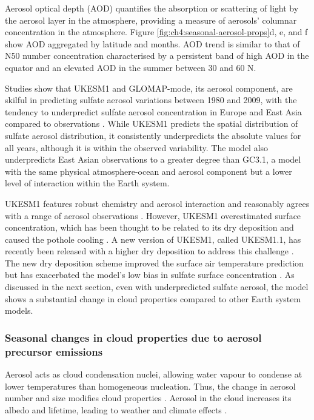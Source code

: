 Aerosol optical depth (AOD) quantifies the absorption or scattering of light by the aerosol layer in the atmosphere, providing a measure of aerosols' columnar concentration in the atmosphere. Figure \ref{fig:ch4:seasonal-aerosol-props}d, e, and f show AOD aggregated by latitude and months. AOD trend is similar to that of N50 number concentration characterised by a persistent band of high AOD in the equator and an elevated AOD in the summer between 30 and 60 \textdegree N. 

Studies show that UKESM1 and GLOMAP-mode, its aerosol component, are skilful in predicting sulfate aerosol variations between 1980 and 2009, with the tendency to underpredict sulfate aerosol concentration in Europe and East Asia compared to observations \citep{mannDescriptionEvaluationGLOMAPmode2010, mulcahyDescriptionEvaluationAerosol2020}. While UKESM1 predicts the spatial distribution of sulfate aerosol distribution, it consistently underpredicts the absolute values for all years, although it is within the observed variability. The model also underpredicts East Asian observations to a greater degree than GC3.1, a model with the same physical atmosphere-ocean and aerosol component but a lower level of interaction within the Earth system. 

UKESM1 features robust chemistry and aerosol interaction and reasonably agrees with a range of aerosol observations \citep{mulcahyDescriptionEvaluationAerosol2020}. However, UKESM1 overestimated surface  concentration, which has been thought to be related to its dry deposition and caused the pothole cooling \citep{hardacreEvaluationSO2SO422021}. A new version of UKESM1, called UKESM1.1, has recently been released with a higher  dry deposition to address this challenge \citep{mulcahyUKESM11DevelopmentEvaluation2023}. The new dry deposition scheme improved the surface air temperature prediction but has exacerbated the model's low bias in sulfate surface concentration \citep{hardacreEvaluationSO2SO422021}. As discussed in the next section, even with underpredicted sulfate aerosol, the model shows a substantial change in cloud properties compared to other Earth system models. 

\subsubsection{Seasonal changes in cloud properties due to aerosol precursor emissions}

Aerosol acts as cloud condensation nuclei, allowing water vapour to condense at lower temperatures than homogeneous nucleation. Thus, the change in aerosol number and size modifies cloud properties \citep[e.g. ][]{rosenfeldGlobalObservationsAerosolcloudprecipitationclimate2014, boucherCloudsAerosols2014,persadAerosolsMustBe2022}. Aerosol in the cloud increases its albedo and lifetime, leading to weather and climate effects \citep{twomeyInfluencePollutionShortwave1977, albrechtAerosolsCloudMicrophysics1989}.


